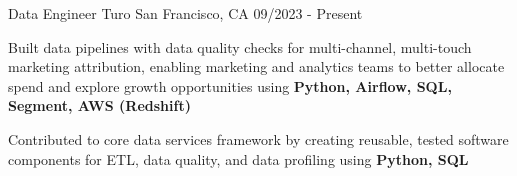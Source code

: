 

\begin{cventries}

\cventry
    {Data Engineer} %
    {Turo} %
    {San Francisco, CA} %
    {09/2023 - Present} %
    {
      \begin{cvitems} %
 		\item {Built data pipelines with data quality checks for multi-channel, multi-touch marketing attribution, enabling marketing and analytics teams to better allocate spend and explore growth opportunities using \textbf{Python, Airflow, SQL, Segment, AWS (Redshift)}}
      \item {Contributed to core data services framework by creating reusable, tested software components for ETL, data quality, and data profiling using \textbf{Python, SQL}}
      \end{cvitems}
    }


\end{cventries}
